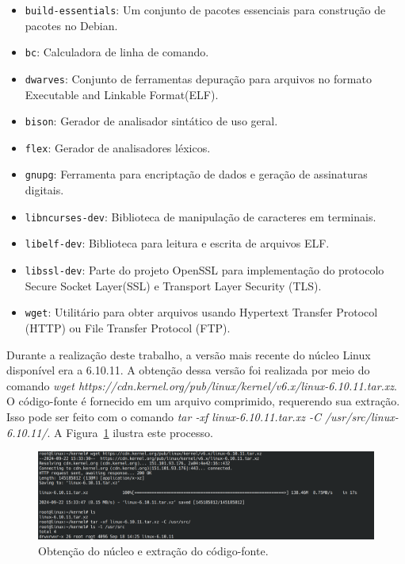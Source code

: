\documentclass[
	12pt,				%
	oneside,   	        %
	a4paper,			%
	english,			%
	french,				%
	spanish,			%
	brazil,				%
	]{pacotes/abntex2}
\begin{document}
\begin{itemize}
    \item \texttt{build-essentials}: Um conjunto de pacotes essenciais para construção de pacotes no Debian.

    \item \texttt{bc}: Calculadora de linha de comando.

    \item \texttt{dwarves}: Conjunto de ferramentas depuração para arquivos no formato Executable and Linkable Format(ELF).

    \item \texttt{bison}: Gerador de analisador sintático de uso geral. 

    \item \texttt{flex}: Gerador de analisadores léxicos.
    
    \item \texttt{gnupg}: Ferramenta para encriptação de dados e geração de assinaturas digitais.

    \item \texttt{libncurses-dev}: Biblioteca de manipulação de caracteres em terminais.

    \item \texttt{libelf-dev}: Biblioteca para leitura e escrita de arquivos ELF.
    
    \item \texttt{libssl-dev}: Parte do projeto OpenSSL para implementação do protocolo Secure Socket Layer(SSL) e Transport Layer Security (TLS).

    \item \texttt{wget}: Utilitário para obter arquivos usando Hypertext Transfer Protocol (HTTP) ou File Transfer Protocol (FTP).
\end{itemize}

Durante a realização deste trabalho, a versão mais recente do núcleo Linux disponível era a 6.10.11. A obtenção dessa versão foi realizada por meio do comando \textit{wget https://cdn.kernel.org/pub/linux/kernel/v6.x/linux-6.10.11.tar.xz}. O código-fonte é fornecido em um arquivo comprimido, requerendo sua extração. Isso pode ser feito com o comando \textit{tar -xf linux-6.10.11.tar.xz -C /usr/src/linux-6.10.11/}. A Figura~\ref{fig:wget} ilustra este processo.

\begin{figure}[H]
  \centering
  \includegraphics[scale=0.3]{figuras/wget.png}
  \caption{Obtenção do núcleo e extração do código-fonte.}
  \label{fig:wget}
\end{figure}
\end{document}
